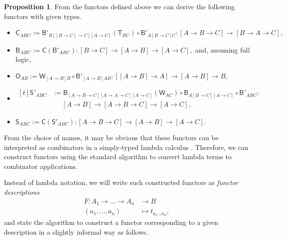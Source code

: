 \documentclass[a4paper]{article}
\theoremstyle{definition}
\newtheorem{proposition}[definition]{Proposition}
\theoremstyle{remark}
\newcommand{\defn}{\emph}
\newcommand{\nm}{\mathsf}
\newcommand{\combinator}{\nm}
\newcommand{\revAppFun}{\combinator{T}}
\newcommand{\compFun}{\combinator{B'}}
\newcommand{\revCompFun}{\combinator{B}}
\newcommand{\swapFun}{\combinator{C}}
\newcommand{\dupFun}{\combinator{W}}
\newcommand{\revSelfAppFun}{\combinator{O}}
\newcommand{\substFun}{\combinator{S'}}
\newcommand{\revSubstFun}{\combinator{S}}
\begin{document}
\begin{proposition}
From the functors defined above we can derive the following functors with given types.
  \begin{itemize}
    \item $\swapFun_{ABC} := \compFun_{B[[B{\to}C]{\to}C][A{\to}C]}(\revAppFun_{BC}) \circ \compFun_{A[B{\to}C]C} :
                             [A \to B \to C] \to [B \to A \to C],$
    \item $\revCompFun_{ABC} := \swapFun(\compFun_{ABC}) :
                                [B \to C] \to [A \to B] \to [A \to C],$
    and, assuming full logic,
    \item $\revSelfAppFun_{AB} := \dupFun_{[A{\to}B]B} \circ \compFun_{[A{\to}B]AB} :
                                  [[A \to B] \to A] \to [A \to B] \to B,$
    \item $\begin{aligned}[t]
      \substFun_{ABC} &:= \revCompFun_{[A{\to}B{\to}C][A{\to}A{\to}C][A{\to}C]}(\dupFun_{AC}) \circ
                          \revCompFun_{A[B{\to}C][A{\to}C]} \circ
                          \compFun_{ABC} :\\
                      &\quad\ \ [A \to B] \to [A \to B \to C] \to [A \to C],
    \end{aligned}$
    \item $\revSubstFun_{ABC} := \swapFun(\substFun_{ABC}) :
                                 [A \to B \to C] \to [A \to B] \to [A \to C].$
  \end{itemize}
\end{proposition}
\vspace{1ex}

From the choice of names, it may be obvious that these functors can be interpreted as combinators
\cite{combinators} in a simply-typed lambda calculus \cite{simply-typed-lambda-calculus}. Therefore,
we can construct functors using the standard algorithm to convert lambda terms to combinator
applications.

Instead of lambda notation, we will write such constructed functors as \defn{functor descriptions}
\begin{align*}
  F : A_1 \to \dots \to A_n &\to     B\\
      (a_1,\dots,a_n)       &\mapsto t_{a_1 \dots a_n},
\end{align*}
and state the algorithm to construct a functor corresponding to a given description in a slightly
informal way as follows.
\end{document}
